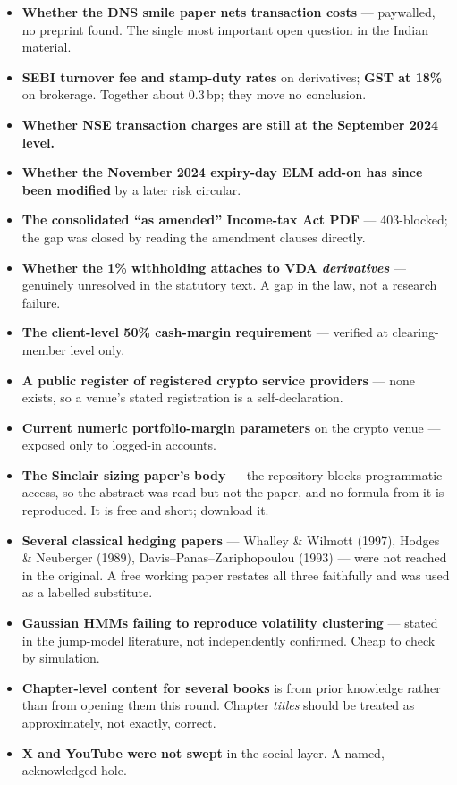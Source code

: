 \documentclass[11pt,a4paper]{article}
\begin{document}
\begin{itemize}
\item \textbf{Whether the DNS smile paper nets transaction costs} --- paywalled, no
preprint found. The single most important open question in the Indian material.
\item \textbf{SEBI turnover fee and stamp-duty rates} on derivatives; \textbf{GST at
18\%} on brokerage. Together about 0.3\,bp; they move no conclusion.
\item \textbf{Whether NSE transaction charges are still at the September 2024 level.}
\item \textbf{Whether the November 2024 expiry-day ELM add-on has since been
modified} by a later risk circular.
\item \textbf{The consolidated ``as amended'' Income-tax Act PDF} --- 403-blocked;
the gap was closed by reading the amendment clauses directly.
\item \textbf{Whether the 1\% withholding attaches to VDA \emph{derivatives}} ---
genuinely unresolved in the statutory text. A gap in the law, not a research failure.
\item \textbf{The client-level 50\% cash-margin requirement} --- verified at
clearing-member level only.
\item \textbf{A public register of registered crypto service providers} --- none
exists, so a venue's stated registration is a self-declaration.
\item \textbf{Current numeric portfolio-margin parameters} on the crypto venue ---
exposed only to logged-in accounts.
\item \textbf{The Sinclair sizing paper's body} --- the repository blocks
programmatic access, so the abstract was read but not the paper, and no formula from
it is reproduced. It is free and short; download it.
\item \textbf{Several classical hedging papers} --- Whalley \& Wilmott (1997),
Hodges \& Neuberger (1989), Davis--Panas--Zariphopoulou (1993) --- were not reached
in the original. A free working paper restates all three faithfully and was used as
a labelled substitute.
\item \textbf{Gaussian HMMs failing to reproduce volatility clustering} --- stated
in the jump-model literature, not independently confirmed. Cheap to check by simulation.
\item \textbf{Chapter-level content for several books} is from prior knowledge
rather than from opening them this round. Chapter \emph{titles} should be treated as
approximately, not exactly, correct.
\item \textbf{X and YouTube were not swept} in the social layer. A named,
acknowledged hole.
\end{itemize}
\end{document}
